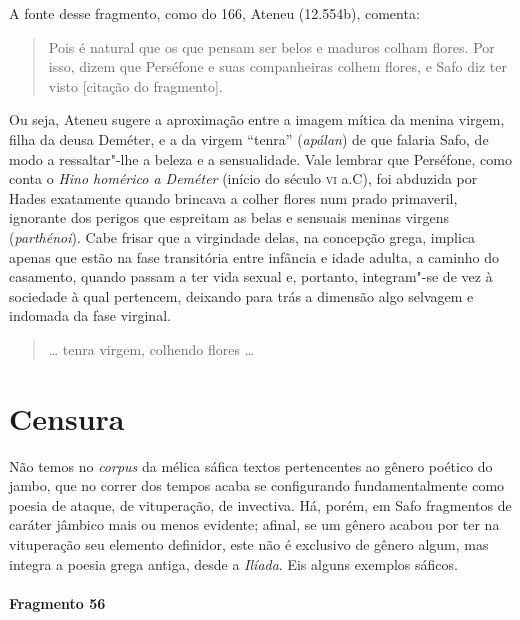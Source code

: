 {\small A fonte desse fragmento, como do 166, Ateneu (12.554b), comenta: 

\begin{quote}
Pois é natural
que os que pensam ser belos e maduros colham flores. Por isso, dizem que
Perséfone e suas companheiras colhem flores, e Safo diz ter visto 
[citação do fragmento].
\end{quote}

 Ou seja, Ateneu sugere a aproximação entre a imagem
mítica da menina virgem, filha da deusa Deméter, e a da virgem ``tenra”
(\textit{apálan}) de que falaria Safo, de modo a ressaltar"-lhe a beleza e a
sensualidade. Vale lembrar que Perséfone, como conta o \textit{Hino homérico a Deméter} 
(início do século \textsc{vi} a.C), foi abduzida por Hades exatamente
quando brincava a colher flores num prado primaveril, ignorante dos perigos que
espreitam as belas e sensuais meninas virgens (\textit{parthénoi}). Cabe frisar que a virgindade delas,
na concepção grega, implica
apenas que estão na fase transitória entre infância e idade
adulta, a caminho do casamento, quando passam a ter vida sexual e, portanto, integram"-se
de vez à sociedade à qual pertencem, deixando para trás a dimensão algo
selvagem e indomada da fase virginal.}

\begin{verse}
\ldots{} tenra virgem, colhendo flores \ldots{}
\end{verse}


\section{Censura}

Não temos no \textit{corpus }da mélica sáfica textos pertencentes ao gênero
poético do jambo, que no correr dos tempos acaba se configurando fundamentalmente como poesia de
ataque, de vituperação, de invectiva. Há, porém, em Safo
fragmentos de caráter jâmbico mais ou menos evidente; afinal, se um gênero
acabou por ter na vituperação seu elemento definidor, este não é exclusivo de
gênero algum, mas integra a poesia grega antiga, desde a \textit{Ilíada}. Eis
alguns exemplos sáficos.

\paragraph{Fragmento 56}

